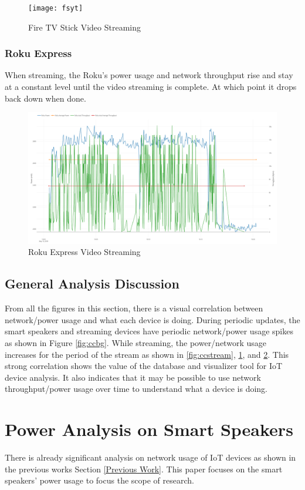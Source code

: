 \begin{figure}[H]
  \centering
  \texttt{[image: fsyt]}
  \caption{Fire TV Stick Video Streaming}
  \label{fig:fsyt}
\end{figure}

\subsubsection{Roku Express}
When streaming, the Roku's power usage and network throughput rise and stay at a constant level until the video streaming is complete. At which point it drops back down when done.

\begin{figure}[H]
  \centering
  \includegraphics[width=1\textwidth]{figures/rokuStreaming.png}
  \caption{Roku Express Video Streaming}
  \label{fig:rokuStreaming}
\end{figure}

\subsection{General Analysis Discussion}
From all the figures in this section, there is a visual correlation between network/power usage and what each device is doing. During periodic updates, the smart speakers and streaming devices have periodic network/power usage spikes as shown in Figure \ref{fig:ccbg}. While streaming, the power/network usage increases for the period of the stream as shown in \ref{fig:ccstream}, \ref{fig:fsyt}, and \ref{fig:rokuStreaming}. This strong correlation shows the value of the database and visualizer tool for IoT device analysis. It also indicates that it may be possible to use network throughput/power usage over time to understand what a device is doing.

\section{Power Analysis on Smart Speakers}
\label{Power Analysis on Smart Speakers}
There is already significant analysis on network usage of IoT devices as shown in the previous works Section \ref{Previous Work}. This paper focuses on the smart speakers' power usage to focus the scope of research.

